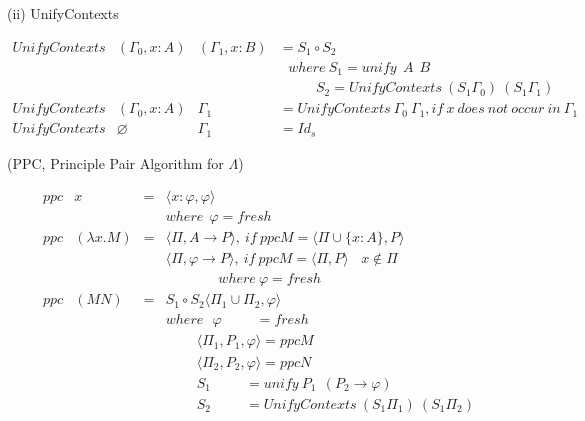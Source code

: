 \noindent (ii) UnifyContexts

\begin{equation*}
\begin{array}{llll}
UnifyContexts & (\Gamma _0,x:A) & (\Gamma _1,x:B) & = S_1\circ S_2\\
&&&\ \ \ where\ S_1 = unify\ \ A\ \ B\\
&&&\ \ \ \ \ \ \ \ \ \ \ \ S_2 = UnifyContexts\ (S_1\Gamma _0)\ (S_1\Gamma _1)\\
UnifyContexts & (\Gamma _0,x:A) & \Gamma _1 & = UnifyContexts\ \Gamma _0\ \Gamma _1, if\ x\ does\ not\ occur\ in\ \Gamma _1\\
UnifyContexts & \varnothing & \Gamma _1 & =  Id_s
\end{array}
\end{equation*}



\begin{def1}{\label{def:ppc}}
\normalfont (PPC, Principle Pair Algorithm for $\Lambda$)
\end{def1}

\begin{equation*}
\begin{array}{llll}
ppc & x & = & \langle x:\varphi,\varphi \rangle\\
&&& where\ \ \varphi=fresh\\
ppc & (\lambda x.M) & = & \langle \Pi,A \rightarrow P \rangle,\ if\ ppcM=\langle \Pi \cup \{x:A\},P \rangle\\
&&& \langle \Pi,\varphi \rightarrow P \rangle,\ if\ ppcM=\langle \Pi ,P \rangle\ \ \ \ x\not\in \Pi\\
&&&\ \ \ \ \ \ \ \ \ \ \ \ \ \ \ \ \ where\ \varphi=fresh\\
ppc & (MN) & = & S_1\circ S_2\langle \Pi _1\cup \Pi _2,\varphi \rangle\\
&&& where\ \ \ \varphi \ \ \ \ \ \ \ \ \ \ \ = fresh\\
&&& \ \ \ \ \ \ \ \ \ \ \langle \Pi _1,P_1,\varphi \rangle = ppcM\\
&&& \ \ \ \ \ \ \ \ \ \ \langle \Pi _2,P_2,\varphi \rangle = ppcN\\
&&& \ \ \ \ \ \ \ \ \ \ S_1 \ \ \ \ \ \ \ \ \ \ \ = unify\ P_1\ \ (P_2 \rightarrow \varphi)\\
&&& \ \ \ \ \ \ \ \ \ \ S_2 \ \ \ \ \ \ \ \ \ \ \ = UnifyContexts\ (S_1\Pi _1)\ (S_1\Pi _2)\\
\end{array}
\end{equation*}
